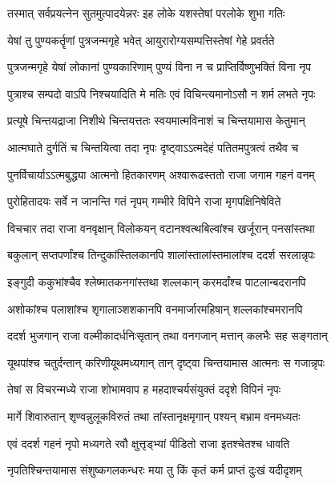 \twolineshloka
{तस्मात् सर्वप्रयत्नेन सुतमुत्पादयेन्नरः}
{इह लोके यशस्तेषां परलोके शुभा गतिः}%

\twolineshloka
{येषां तु पुण्यकर्तॄणां पुत्रजन्मगृहे भवेत्}
{आयुरारोग्यसम्पत्तिस्तेषां गेहे प्रवर्तते}%

\twolineshloka
{पुत्रजन्मगृहे येषां लोकानां पुण्यकारिणाम्}
{पुण्यं विना न च प्राप्तिर्विष्णुभक्तिं विना नृप}%

\twolineshloka
{पुत्राश्च सम्पदो वाऽपि निश्चयादिति मे मतिः}
{एवं विचिन्त्यमानोऽसौ न शर्म लभते नृपः}%

\twolineshloka
{प्रत्यूषे चिन्तयद्राजा निशीथे चिन्तयत्ततः}
{स्वयमात्मविनाशं च चिन्तयामास केतुमान्}%

\twolineshloka
{आत्मघाते दुर्गतिं च चिन्तयित्वा तदा नृपः}
{दृष्ट्वाऽऽत्मदेहं पतितमपुत्रत्वं तथैव च}%

\twolineshloka
{पुनर्विचार्याऽऽत्मबुद्ध्या आत्मनो हितकारणम्}
{अश्वारूढस्ततो राजा जगाम गहनं वनम्}%

\twolineshloka
{पुरोहितादयः सर्वे न जानन्ति गतं नृपम्}
{गम्भीरे विपिने राजा मृगपक्षिनिषेविते}%

\twolineshloka
{विचचार तदा राजा वनवृक्षान् विलोकयन्}
{वटानश्वत्थबिल्वांश्च खर्जूरान् पनसांस्तथा}%

\twolineshloka
{बकुलान् सप्तपर्णांश्च तिन्दुकांस्तिलकानपि}
{शालांस्तालांस्तमालांश्च ददर्श सरलान्नृपः}%

\twolineshloka
{इङ्गुदी ककुभांश्चैव श्लेष्मातकनगांस्तथा}
{शल्लकान् करमर्दांश्च पाटलान्बदरानपि}%

\twolineshloka
{अशोकांश्च पलाशांश्च शृगालाञ्शशकानपि}
{वनमार्जारमहिषान् शल्लकांश्चमरानपि}%

\twolineshloka
{ददर्श भुजगान् राजा वल्मीकादर्धनिःसृतान्}
{तथा वनगजान् मत्तान् कलभैः सह सङ्गतान्}%

\twolineshloka
{यूथपांश्च चतुर्दन्तान् करिणीयूथमध्यगान्}
{तान् दृष्ट्वा चिन्तयामास आत्मनः स गजान्नृपः}%

\twolineshloka
{तेषां स विचरन्मध्ये राजा शोभामवाप ह}
{महदाश्चर्यसंयुक्तं ददृशे विपिनं नृपः}%

\twolineshloka
{मार्गे शिवारुतान् शृण्वन्नुलूकविरुतं तथा}
{तांस्तानृक्षमृगान् पश्यन् बभ्राम वनमध्यतः}%

\twolineshloka
{एवं ददर्श गहनं नृपो मध्यगते रवौ}
{क्षुत्तृड्भ्यां पीडितो राजा इतश्चेतश्च धावति}%

\twolineshloka
{नृपतिश्चिन्तयामास संशुष्कगलकन्धरः}
{मया तु किं कृतं कर्म प्राप्तं दुःखं यदीदृशम्}%

